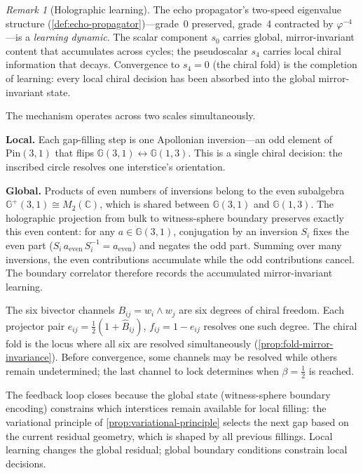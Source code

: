 \documentclass[11pt,a4paper]{article}
\theoremstyle{plain}
\theoremstyle{definition}
\theoremstyle{remark}
\newtheorem{remark}[theorem]{Remark}
\numberwithin{equation}{section}
\newcommand{\Cl}{\mathbb{G}}
\newcommand{\vp}{\varphi}
\begin{document}
\begin{remark}[Holographic learning]
\label{rmk:holographic-learning}
The echo propagator's two-speed eigenvalue structure
(\cref{def:echo-propagator})---grade~0 preserved, grade~4 contracted by
\(\vp^{-4}\)---is a \emph{learning dynamic}.  The scalar component
\(s_0\) carries global, mirror-invariant content that accumulates across
cycles; the pseudoscalar \(s_4\) carries local chiral information that
decays.  Convergence to \(s_4=0\) (the chiral fold) is the completion
of learning: every local chiral decision has been absorbed into the
global mirror-invariant state.

The mechanism operates across two scales simultaneously.

\textbf{Local.}
Each gap-filling step is one Apollonian inversion---an odd element of
\(\mathrm{Pin}(3,1)\) that flips \(\Cl(3,1)\leftrightarrow\Cl(1,3)\).
This is a single chiral decision: the inscribed circle resolves one
interstice's orientation.

\textbf{Global.}
Products of even numbers of inversions belong to the even subalgebra
\(\Cl^+(3,1)\cong M_2(\mathbb{C})\), which is shared between
\(\Cl(3,1)\) and \(\Cl(1,3)\).  The holographic projection from bulk to
witness-sphere boundary preserves exactly this even content: for any
\(a\in\Cl(3,1)\), conjugation by an inversion \(S_i\) fixes the even
part (\(S_i\,a_{\mathrm{even}}\,S_i^{-1}=a_{\mathrm{even}}\)) and
negates the odd part.  Summing over many inversions, the even
contributions accumulate while the odd contributions cancel.  The
boundary correlator therefore records the accumulated
mirror-invariant learning.

The six bivector channels \(B_{ij}=w_i\wedge w_j\) are six degrees of
chiral freedom.  Each projector pair
\(e_{ij}=\tfrac12(1+\hat B_{ij})\), \(f_{ij}=1-e_{ij}\) resolves one
such degree.  The chiral fold is the locus where all six are resolved
simultaneously (\cref{prop:fold-mirror-invariance}).  Before
convergence, some channels may be resolved while others remain
undetermined; the last channel to lock determines when
\(\beta=\tfrac12\) is reached.

The feedback loop closes because the global state (witness-sphere
boundary encoding) constrains which interstices remain available for
local filling: the variational principle of
\cref{prop:variational-principle} selects the next gap based on the
current residual geometry, which is shaped by all previous fillings.
Local learning changes the global residual; global boundary conditions
constrain local decisions.
\end{remark}
\end{document}
